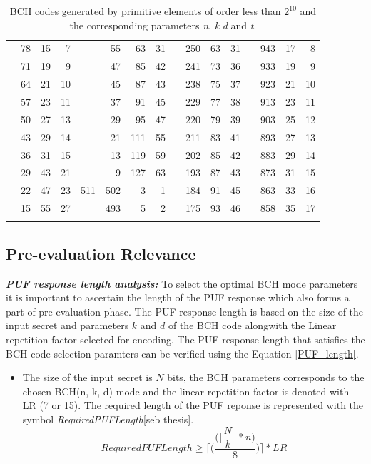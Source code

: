 \begin{table}[!ht]
\begin{center}
\begin{tabular}{rrrr|rrrr|rrrr|rrrr}
&78&15&7&&55&63&31&&250&63&31&&943&17&8\\
&71&19&9&&47&85&42&&241&73&36&&933&19&9\\
&64&21&10&&45&87&43&&238&75&37&&923&21&10\\
&57&23&11&&37&91&45&&229&77&38&&913&23&11\\
&50&27&13&&29&95&47&&220&79&39&&903&25&12\\
&43&29&14&&21&111&55&&211&83&41&&893&27&13\\
&36&31&15&&13&119&59&&202&85&42&&883&29&14\\
&29&43&21&&9&127&63&&193&87&43&&873&31&15\\
&22&47&23&511&502&3&1&&184&91&45&&863&33&16\\
&15&55&27&&493&5&2&&175&93&46&&858&35&17\\
\hline
\addlinespace
\bottomrule
\end{tabular}
\end{center}
\caption{BCH codes generated by primitive elements of order less than $2^{10}$ and the corresponding parameters \emph{n}, \emph{k} \emph{d} and \emph{t}.}
\label{tab:BCHmodes}
\end{table}

\subsection{Pre-evaluation Relevance}
\emph{\textbf{PUF response length analysis:}} To select the optimal BCH mode parameters it is important to ascertain the length of the PUF response which also forms a part of pre-evaluation phase. The PUF response length is based on the size of the input secret and parameters $k$ and $d$ of the BCH code alongwith the Linear repetition factor selected for encoding. The PUF response length that satisfies the BCH code selection paramters can be verified using the Equation
		\ref{PUF_length}.
\begin{itemize}
	\item The size of the input secret is $N$ bits, the BCH parameters corresponds to the chosen BCH(n, k, d) mode and the linear repetition factor is denoted with LR (7 or 15). The required length of the PUF reponse is represented with the symbol \emph{RequiredPUFLength}[seb thesis].\\
		\begin{equation}
			RequiredPUFLength \geq \Bigg\lceil\Bigg(\dfrac{\Bigg(\Bigg\lceil\dfrac{N}{k}\Bigg\rceil
		* n\Bigg)}{8}\Bigg)\Bigg\rceil * LR
		\label{PUF_length}
		\end{equation}
\end{itemize}

